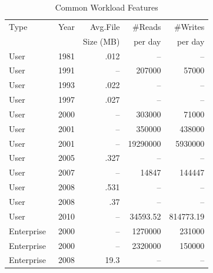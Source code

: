 \begin{table}[h]
\centering
\caption{Common Workload Features}
\label{tab:workloads}
\small
\begin{tabular}{lcrrr}
\toprule
\small
Type & Year & Avg.File & \#Reads & \#Writes\\ %
&& Size (MB) &per day&per day\\ %
\midrule
User~\cite{dayal} & 1981 & .012 & -- & -- \\%
User~\cite{roselli} & 1991 & -- & 207000 & 57000 \\%
User~\cite{dayal} & 1993 & .022 & -- & -- \\%
User~\cite{dayal} & 1997 & .027 & -- & -- \\%
User~\cite{roselli} & 2000 & -- & 303000 & 71000 \\%
User~\cite{ellard} & 2001 & -- & 350000 & 438000 \\%
User~\cite{ellard} & 2001 & -- & 19290000 & 5930000 \\%
User~\cite{dayal} & 2005 & .327 & -- & -- \\%
User~\cite{narayanan2008write} & 2007 & -- & 14847 & 144447 \\%
User~\cite{dayal} & 2008 & .531 & -- & -- \\%
User~\cite{dayal} & 2008 & .37 & -- & -- \\%
User~\cite{fiu-dedup} & 2010 & -- & 34593.52 & 814773.19 \\%
Enterprise~\cite{roselli} & 2000 & -- & 1270000 & 231000 \\%
Enterprise~\cite{roselli} & 2000 & -- & 2320000 & 150000 \\%
Enterprise~\cite{dayal} & 2008 & 19.3 & -- & -- \\%

\end{tabular}
\end{table}
